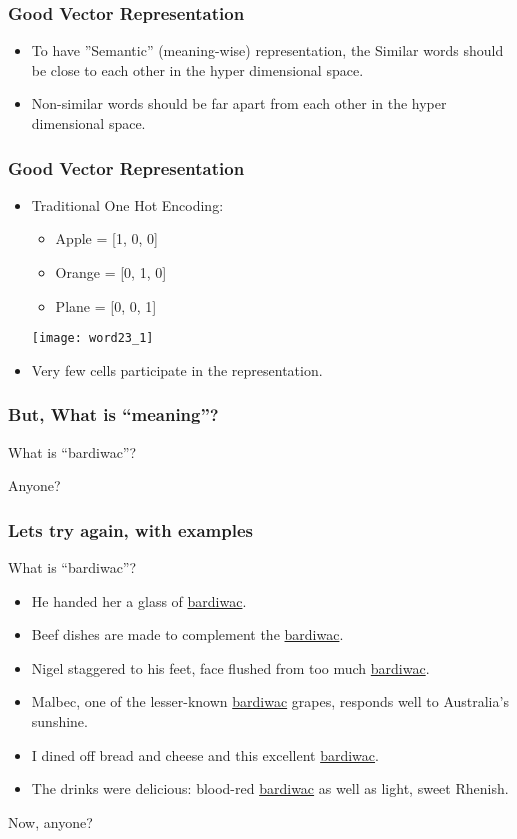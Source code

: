 \begin{frame}[fragile]\frametitle{Good Vector Representation}
\begin{itemize}
\item To have ''Semantic'' (meaning-wise) representation, the Similar words should be close to each other in the hyper dimensional space.
\item Non-similar words should be far apart from each other in the hyper dimensional space.
\end{itemize}
\end{frame}

\begin{frame}[fragile]\frametitle{Good Vector Representation}
\begin{itemize}
\item Traditional One Hot Encoding:
	\begin{itemize}
	\item Apple = [1, 0, 0]
	\item Orange = [0, 1, 0]
	\item Plane = [0, 0, 1]
	\end{itemize}
\begin{center}
\texttt{[image: word23\_1]}
\end{center}
\item Very few cells participate in the representation.
\end{itemize}
\end{frame}


\begin{frame}[fragile]\frametitle{But, What is ``meaning''?}
What is ``bardiwac''?

Anyone?
\end{frame}

\begin{frame}[fragile]\frametitle{Lets try again, with examples}
What is ``bardiwac''?

\begin{itemize}
\item He handed her a glass of \underline{bardiwac}. 
\item Beef dishes are made to complement the \underline{bardiwac}.
\item Nigel staggered to his feet, face flushed from too much
\underline{bardiwac}. 
\item Malbec, one of the lesser-known \underline{bardiwac} grapes,
responds well to Australia’s sunshine. 
\item I dined off bread and cheese and this excellent \underline{bardiwac}. 
\item The drinks were delicious: blood-red \underline{bardiwac} as well as 
light, sweet Rhenish. 
\end{itemize}

Now, anyone?
\end{frame}

